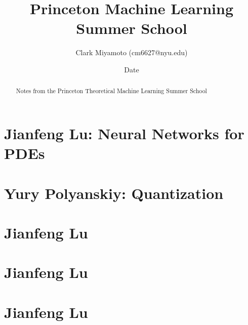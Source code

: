 \documentclass[12pt,fleqn]{article}
\title{Princeton Machine Learning Summer School}
\author{Clark Miyamoto (cm6627@nyu.edu)}
\date{Date}
\numberwithin{equation}{section} %
\begin{document}
\maketitle


\begin{abstract}
	Notes from the Princeton Theoretical Machine Learning Summer School
\end{abstract}

\part{Jianfeng Lu: Neural Networks for PDEs}

\newpage

\part{Yury Polyanskiy: Quantization}

\newpage

\part{Jianfeng Lu}
\newpage

\part{Jianfeng Lu}
\newpage

\part{Jianfeng Lu}
\newpage
\end{document}
